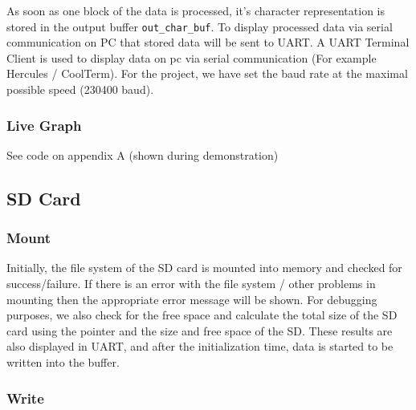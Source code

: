 \documentclass[11pt]{article}
\begin{document}
As soon as one block of the data is processed, it's character representation is stored in the output buffer \texttt{out\_char\_buf}. To display processed data via serial communication on PC that stored data will be sent to UART. A UART Terminal Client is used to display data on pc via serial communication (For example Hercules / CoolTerm). For the project, we have set the baud rate at the maximal possible speed (230400 baud).

\subsubsection*{Live Graph}
\label{sec:orgc4c7576}
See code on appendix A (shown during demonstration)

\subsection{SD Card}
\label{sec:org02a5724}

\subsubsection*{Mount}
\label{sec:orgbc52f46}

Initially, the file system of the SD card is mounted into memory and checked for success/failure. If there is an error with the file system / other problems in mounting then the appropriate error message will be shown. For debugging purposes, we also check for the free space and calculate the total size of the SD card using the pointer and the size and free space of the SD. These results are also displayed in UART, and after the initialization time, data is started to be written into the buffer.
\subsubsection*{Write}
\label{sec:org22a26c2}
\end{document}
